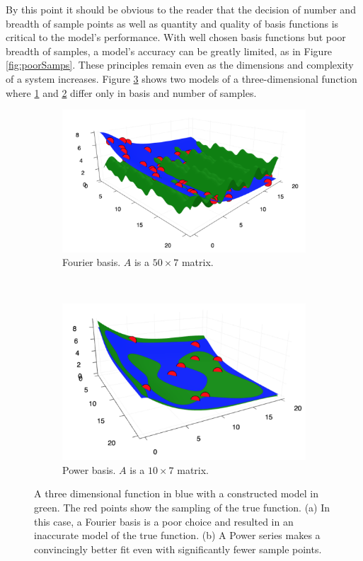 \par By this point it should be obvious to the reader that the decision of number and breadth of sample points as well as quantity and quality of basis functions is critical to the model's performance. With well chosen basis functions but poor breadth of samples, a model's accuracy can be greatly limited, as in Figure \ref{fig:poorSamps}. These principles remain even as the dimensions and complexity of a system increases. Figure \ref{fig:3dFit} shows two models of a three-dimensional function where \ref{fig:3dFourier} and \ref{fig:3dPower} differ only in basis and number of samples.

\begin{figure}
  \begin{subfigure}{0.35\textwidth}
    \includegraphics[width=\linewidth]{Figures/3dFourier}
    \caption{Fourier basis. $A$ is a $50\times7$ matrix.} 
    \label{fig:3dFourier}
  \end{subfigure}%
  \\
  \begin{subfigure}{0.35\textwidth}
    \includegraphics[width=\linewidth]{Figures/3dPower}
    \caption{Power basis. $A$ is a $10\times7$ matrix.} 
    \label{fig:3dPower}
  \end{subfigure}%
\caption{A three dimensional function in blue with a constructed model in green. The red points show the sampling of the true function. (a) In this case, a Fourier basis is a poor choice and resulted in an inaccurate model of the true function. (b) A Power series makes a convincingly better fit even with significantly fewer sample points.} \label{fig:3dFit}
\end{figure}


